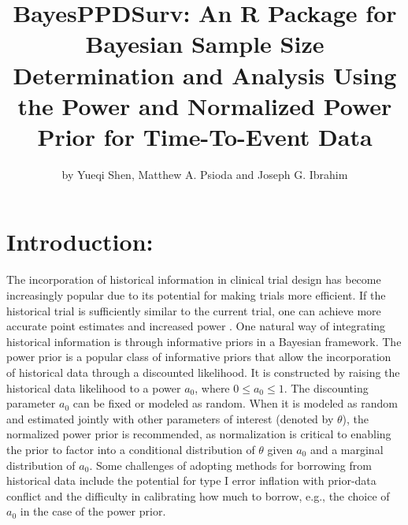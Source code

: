 \title{BayesPPDSurv: An R Package for Bayesian Sample Size Determination and Analysis Using the Power and Normalized Power Prior for Time-To-Event Data}
\author{by Yueqi Shen, Matthew A. Psioda and Joseph G. Ibrahim}

\maketitle


\section{Introduction: } \label{sec:intro}

The incorporation of historical information in clinical trial design has become increasingly popular due to its potential for making trials more efficient. If the historical trial is sufficiently similar to the current trial, one can achieve more accurate point estimates and increased power \citep{Viele_2014}. One natural way of integrating historical information is through informative priors in a Bayesian framework. The power prior \citep{ibrahim_2000} is a popular class of informative priors that allow the incorporation of historical data through a discounted likelihood. It is constructed by raising the historical data likelihood to a power $a_0$, where $0 \le a_0 \le 1$. The discounting parameter $a_0$ can be fixed or modeled as random. When it is modeled as random and estimated jointly with other parameters of interest (denoted by $\theta$), the normalized power prior \citep{duan_2006} is recommended, as normalization is critical to enabling the prior to factor into a conditional distribution of $\theta$ given $a_0$ and a marginal distribution of $a_0$. Some challenges of adopting methods for borrowing from historical data include the potential for type I error inflation with prior-data conflict and the difficulty in calibrating how much to borrow, e.g., the choice of $a_0$ in the case of the power prior. 

